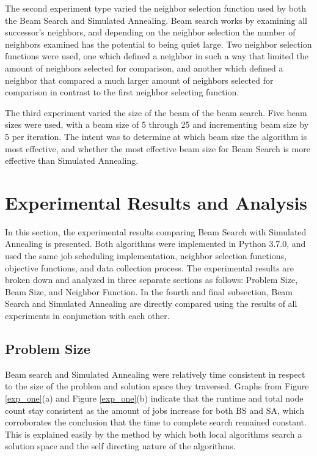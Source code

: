 \documentclass[10pt, twocolumn]{article}
\begin{document}
The second experiment type varied the neighbor selection function used by both the Beam Search and Simulated Annealing. Beam search works by examining all successor's neighbors, and depending on the neighbor selection the number of neighbors examined has the potential to being quiet large. Two neighbor selection functions were used, one which defined a neighbor in such a way that limited the amount of neighbors selected for comparison, and another which defined a neighbor that compared a much larger amount of neighbors selected for comparison in contrast to the first neighbor selecting function.

The third experiment varied the size of the beam of the beam search. Five beam sizes were used, with a beam size of 5 through 25 and incrementing beam size by 5 per iteration. The intent was to determine at which beam size the algorithm is most effective, and whether the most effective beam size for Beam Search is more effective than Simulated Annealing.

\section{Experimental Results and Analysis}

In this section, the experimental results comparing Beam Search with Simulated Annealing is presented. Both algorithms were implemented in Python 3.7.0, and used the same job scheduling implementation, neighbor selection functions, objective functions, and data collection process. The experimental results are broken down and analyzed in three separate sections as follows: Problem Size, Beam Size, and Neighbor Function. In the fourth and final subsection, Beam Search and Simulated Annealing are directly compared using the results of all experiments in conjunction with each other.

\subsection{Problem Size}

Beam search and Simulated Annealing were relatively time consistent in respect to the size of the problem and solution space they traversed. Graphs from Figure \ref{exp_one}(a) and Figure \ref{exp_one}(b) indicate that the runtime and total node count stay consistent as the amount of jobs increase for both BS and SA, which corroborates the conclusion that the time to complete search remained constant. This is explained easily by the method by which both local algorithms search a solution space and the self directing nature of the algorithms.
\end{document}
